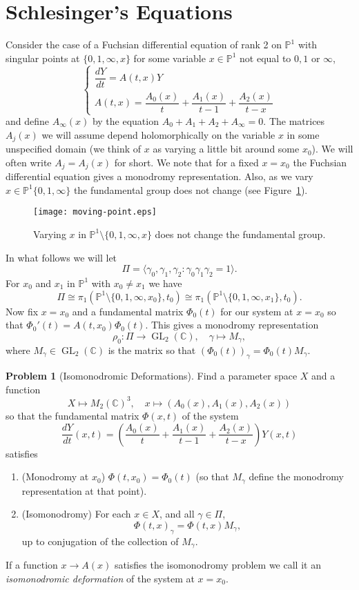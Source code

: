 \documentclass[12pt]{book}
\numberwithin{equation}{section}
\theoremstyle{definition}
\newtheorem{problem}[theorem]{Problem}
\theoremstyle{remark}
\newcommand{\CC}{\mathbb{C}}
\newcommand{\PP}{\mathbb{P}}
\newcommand{\GL}{\operatorname{GL}}
\begin{document}
\section{Schlesinger's Equations}
Consider the case of a Fuchsian differential equation of rank 2 on $\PP^1$ with singular points at $\lbrace 0,1,\infty,x\rbrace$ for some variable $x\in \PP^1$ not equal to $0,1$ or $\infty$,
$$\begin{cases}
	  \dfrac{dY}{dt} = A(t,x) Y \\
	  A(t,x) = \dfrac{A_0(x)}{t} +\dfrac{A_1(x)}{t-1} + \dfrac{A_2(x)}{t-x} 
\end{cases}$$
and define $A_{\infty}(x)$ by the equation $A_0+A_1+A_2 +A_{\infty}=0$.
The matrices $A_j(x)$ we will assume depend holomorphically on the variable $x$ in some unspecified domain (we think of $x$ as varying a little bit around some $x_0$).
We will often write $A_j=A_j(x)$ for short.
We note that for a fixed $x=x_0$ the Fuchsian differential equation gives a monodromy representation. 
Also, as we vary $x\in \PP^1\lbrace 0,1,\infty\rbrace$ the fundamental group does not change (see Figure~\ref{F:moving-point}).
\begin{figure}[h]\label{F:moving-point}
	\begin{center}
		\texttt{[image: moving-point.eps]}
	\end{center}
\caption{Varying $x$ in $\PP^1\setminus\lbrace 0,1,\infty,x\rbrace$ does not change the fundamental group.}
\end{figure}
In what follows we will let 
 $$ \Pi=\langle \gamma_0,\gamma_1,\gamma_2 \colon \gamma_0\gamma_1\gamma_2=1\rangle.$$
For $x_0$ and $x_1$ in $\PP^1$ with $x_0\neq x_1$ we have 
 $$\Pi\cong \pi_1( \PP^1\setminus\lbrace 0,1,\infty,x_0\rbrace,t_0) \cong \pi_1(\PP^1\setminus\lbrace 0,1,\infty,x_1\rbrace,t_0).$$
Now fix $x=x_0$ and a fundamental matrix $\Phi_0(t)$ for our system at $x=x_0$ so that $\Phi_0'(t) = A(t,x_0)\Phi_0(t)$. 
This gives a monodromy representation 
$$ \rho_0\colon \Pi \to \GL_2(\CC), \quad \gamma \mapsto M_{\gamma},$$
where $M_{\gamma} \in \GL_2(\CC)$ is the matrix so that $(\Phi_0(t))_{\gamma} = \Phi_0(t) M_{\gamma}$.

\begin{problem}[Isomonodromic Deformations]
	Find a parameter space $X$ and a function 
	$$X\mapsto M_2(\CC)^3, \quad x\mapsto (A_0(x),A_1(x),A_2(x))$$
	so that the fundamental matrix $\Phi(x,t)$ of the system 
	$$ \dfrac{dY}{dt}(x,t) = \left( \dfrac{A_0(x)}{t} +\dfrac{A_1(x)}{t-1} + \dfrac{A_2(x)}{t-x} \right)Y(x,t) $$
	satisfies
	\begin{enumerate}
		\item (Monodromy at $x_0$) $\Phi(t,x_0) = \Phi_0(t)$ (so that $M_{\gamma}$ define the monodromy representation at that point).
		\item (Isomonodromy) For each $x\in X$, and all $\gamma \in \Pi$, $$\Phi(t,x)_{\gamma} = \Phi(t,x)M_{\gamma},$$
		up to conjugation of the collection of $M_{\gamma}$.
	\end{enumerate}
\end{problem}
 If a function $x\to A(x)$ satisfies the isomonodromy problem we call it an \emph{isomonodromic deformation} of the system at $x=x_0$.
\end{document}
